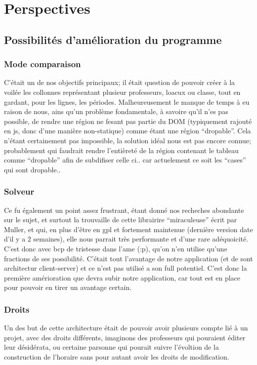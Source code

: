 \chapter{Perspectives}

\section{Possibilités d'amélioration du programme}

\subsection{Mode comparaison}
C'était un de nos objectifs principaux; il était question de pouvoir créer à la
voilée les collonnes représentant plusieur professeurs, loacux ou classe, tout
en gardant, pour les lignes, les périodes. Malheureusement le manque de temps à
eu raison de nous, ains qu'un problème fondamentale, à savoire qu'il n'es pas
possible, de rendre une région ne fesant pas partie du DOM (typiquement rajouté
en js, donc d'une manière non-statique) comme étant une région ``dropable''.
Cela n'étant certainement pas impossible, la solution idéal nous est pas encore
connue; probablement qui faudrait rendre l'entièreté de la région contenant le
tableau comme ``dropable'' afin de subdifiser celle ci.. car actuelement ce soit
les ``cases'' qui sont dropable..

\subsection{Solveur}
Ce fu également un point assez frustrant, étant donné nos recheches abondante
sur le sujet, et surtout la trouvaille de cette librairire ``miraculeuse'' écrit
par Muller, et qui, en plus d'être en gpl et fortement maintenue (dernière
version date d'il y a 2 semaines), elle nous parrait très performante et d'une
rare adéquoicité.  C'est donc avec bcp de tristesse dans l'ame (:p), qu'on n'en
utilise qu'une fractions de ses possibilité.  C'était tout l'avantage de notre
application (et de sont architectur client-server) et ce n'est pas utilisé a son
full potentiel.  C'est donc la première amérioration que devra subir notre
application, car tout est en place pour pouvoir en tirer un avantage certain.

\subsection{Droits}
Un des but de cette architecture était de pouvoir avoir plusieurs compte lié à
un projet, avec des droits différents, imaginons des professeurs qui pouraient
éditer leur désidérata, ou certaine parsonne qui pourait suivre l'évoltion de la
construction de l'horaire sans pour autant avoir les droits de modification.

